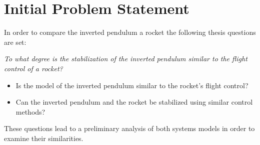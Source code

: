 \chapter{Initial Problem Statement}
In order to compare the inverted pendulum a rocket the following thesis questions are set: 

\textit{To what degree is the stabilization of the inverted pendulum similar to the flight control of a rocket?}
\bigbreak
\begin{itemize}[noitemsep]
\item Is the model of the inverted pendulum similar to the rocket's flight control?
\item Can the inverted pendulum and the rocket be stabilized using similar control methods?
\end{itemize}


These questions lead to a preliminary analysis of both systems models in order to examine their similarities.